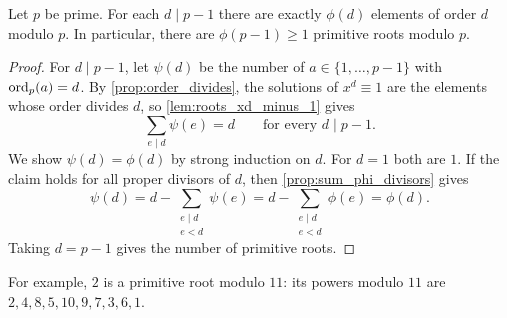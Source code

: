 \begin{theorem}\label{thm:primitive_root_prime}
    Let $p$ be prime. For each $d \mid p - 1$ there are exactly $\phi(d)$ elements of order $d$ modulo $p$. In particular, there are $\phi(p-1) \ge 1$ primitive roots modulo $p$.
\end{theorem}
\begin{proof}
    For $d \mid p - 1$, let $\psi(d)$ be the number of $a \in \{1, \dots, p-1\}$ with $\operatorname{ord}_p(a) = d$. By \cref{prop:order_divides}, the solutions of $x^d \equiv 1$ are the elements whose order divides $d$, so \cref{lem:roots_xd_minus_1} gives
    \begin{equation*}
        \sum_{e \mid d} \psi(e) = d \qquad \text{for every } d \mid p - 1.
    \end{equation*}
    We show $\psi(d) = \phi(d)$ by strong induction on $d$. For $d = 1$ both are $1$. If the claim holds for all proper divisors of $d$, then \cref{prop:sum_phi_divisors} gives
    \begin{equation*}
        \psi(d) = d - \sum_{\substack{e \mid d \\ e < d}} \psi(e) = d - \sum_{\substack{e \mid d \\ e < d}} \phi(e) = \phi(d).
    \end{equation*}
    Taking $d = p - 1$ gives the number of primitive roots.
\end{proof}
For example, $2$ is a primitive root modulo $11$: its powers modulo $11$ are $2, 4, 8, 5, 10, 9, 7, 3, 6, 1$.
